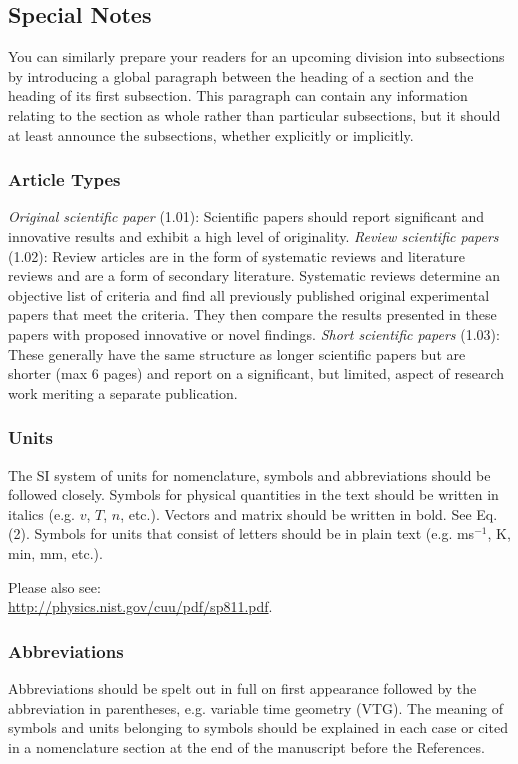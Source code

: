 \documentclass[10pt]{JoME}
\begin{document}
\subsection{Special Notes}
You can similarly prepare your readers for an upcoming division into subsections by introducing a global paragraph between the heading of a section and the heading of its first subsection. This paragraph can contain any information relating to the section as whole rather than particular subsections, but it should at least announce the subsections, whether explicitly or implicitly.


\subsubsection{Article Types}
\emph{Original scientific paper} (1.01): Scientific papers should report significant and innovative results and exhibit a high level of originality. \emph{Review scientific papers} (1.02): Review articles are in the form of systematic reviews and literature reviews and are a form of secondary literature. Systematic reviews determine an objective list of criteria and find all previously published original experimental papers that meet the criteria. They then compare the results presented in these papers with proposed innovative or novel findings. \emph{Short scientific papers} (1.03): These generally have the same structure as longer scientific papers but are shorter (max 6 pages) and report on a significant, but limited, aspect of research work meriting a separate publication.

\subsubsection{Units}
The SI system of units for nomenclature, symbols and abbreviations should be followed closely. Symbols for physical quantities in the text should be written in italics (e.g. $v$, $T$, $n$, etc.). Vectors and matrix should be written in bold. See Eq. (2). Symbols for units that consist of letters should be in plain text (e.g. ms$^{-1}$, K, min, mm, etc.). 

Please also see:\\ \href{http://physics.nist.gov/cuu/pdf/sp811.pdf}{http://physics.nist.gov/cuu/pdf/sp811.pdf}.

\subsubsection{Abbreviations}
Abbreviations should be spelt out in full on first appearance followed by the abbreviation in parentheses, e.g. variable time geometry (VTG). The meaning of symbols and units belonging to symbols should be explained in each case or cited in a nomenclature section at the end of the manuscript before the References.
\end{document}
